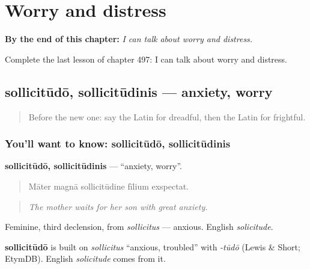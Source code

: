 
\chapter{Worry and distress}
\label{ch:la-worry-and-distress}

\begin{chapteropening}
\textbf{By the end of this chapter:} \emph{I can talk about worry and distress.}

Complete the last lesson of chapter 497: I can talk about worry and distress.
\end{chapteropening}

\section[sollicitūdō, sollicitūdinis]{sollicitūdō, sollicitūdinis — anxiety, worry}

\label{lesson:LA-C497-sollicitudo}



\begin{quote}
Before the new one: say the Latin for dreadful, then the Latin for frightful.
\end{quote}

\subsection*{You'll want to know: sollicitūdō, sollicitūdinis}
\textbf{sollicitūdō, sollicitūdinis} — \textquotedblleft{}anxiety, worry\textquotedblright{}.

\begin{quote}
Māter magnā sollicitūdine fīlium exspectat.
\end{quote}

\begin{quote}
\emph{The mother waits for her son with great anxiety.}
\end{quote}

Feminine, third declension, from \emph{sollicitus} — anxious. English \emph{solicitude}.

\begin{cousinweb}
\textbf{sollicitūdō} is built on \emph{sollicitus} \textquotedblleft{}anxious, troubled\textquotedblright{} with \emph{-tūdō} (Lewis \& Short; EtymDB). English \emph{solicitude} comes from it.
\end{cousinweb}

